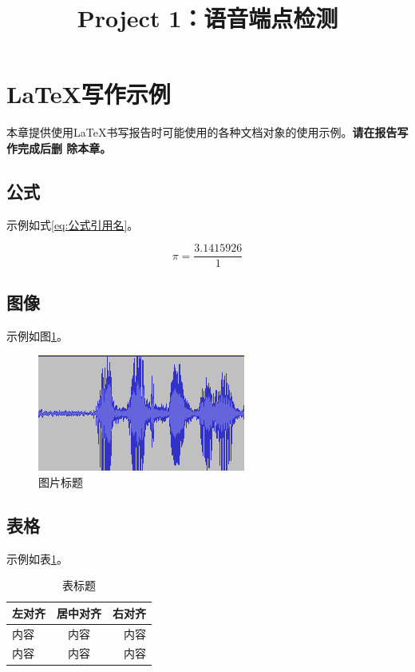 \documentclass[a4paper]{article}
\title{Project 1：语音端点检测}
\begin{document}
\maketitle

\section{LaTeX写作示例}

本章提供使用LaTeX书写报告时可能使用的各种文档对象的使用示例。\textbf{请在报告写作完成后删
除本章。}

\subsection{公式}

示例如式\ref{eq:公式引用名}。

\begin{equation}
  \pi = \dfrac{3.1415926}{1}
  \label{eq:公式引用名}
\end{equation}

\subsection{图像}

示例如图\ref{fig:图片引用名}。

\begin{figure}[htb]
  \centering
  \includegraphics[scale=0.7]{figs/voice.png}
  \caption{图片标题}
  \label{fig:图片引用名}
\end{figure}

\subsection{表格}

示例如表\ref{tab:表引用名}。

\begin{table}[th]
  \caption{表标题}
  \label{tab:表引用名}
  \centering
  \begin{tabular}{ l c r }
    \toprule
    \textbf{左对齐} & \textbf{居中对齐} & \textbf{右对齐} \\
    \midrule
    内容 & 内容 & 内容 \\
    内容 & 内容 & 内容 \\
    \bottomrule
  \end{tabular}
\end{table}
\end{document}
